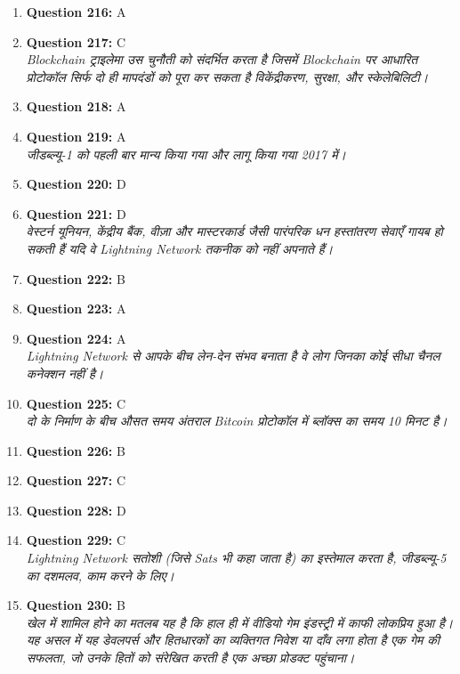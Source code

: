 \documentclass[12pt,a4paper]{article}
\begin{document}
\begin{enumerate}
\item \textbf{Question 216:} A

\item \textbf{Question 217:} C
\\ \textit{Blockchain ट्राइलेमा उस चुनौती को संदर्भित करता है जिसमें Blockchain पर आधारित प्रोटोकॉल सिर्फ दो ही मापदंडों को पूरा कर सकता है विकेंद्रीकरण, सुरक्षा, और स्केलेबिलिटी।}

\item \textbf{Question 218:} A

\item \textbf{Question 219:} A
\\ \textit{जीडब्ल्यू-1 को पहली बार मान्य किया गया और लागू किया गया 2017 में।}

\item \textbf{Question 220:} D

\item \textbf{Question 221:} D
\\ \textit{वेस्टर्न यूनियन, केंद्रीय बैंक, वीज़ा और मास्टरकार्ड जैसी पारंपरिक धन हस्तांतरण सेवाएँ गायब हो सकती हैं यदि वे Lightning Network तकनीक को नहीं अपनाते हैं।}

\item \textbf{Question 222:} B

\item \textbf{Question 223:} A

\item \textbf{Question 224:} A
\\ \textit{Lightning Network से आपके बीच लेन-देन संभव बनाता है वे लोग जिनका कोई सीधा चैनल कनेक्शन नहीं है।}

\item \textbf{Question 225:} C
\\ \textit{दो के निर्माण के बीच औसत समय अंतराल Bitcoin प्रोटोकॉल में ब्लॉक्स का समय 10 मिनट है।}

\item \textbf{Question 226:} B

\item \textbf{Question 227:} C

\item \textbf{Question 228:} D

\item \textbf{Question 229:} C
\\ \textit{Lightning Network सतोशी (जिसे Sats भी कहा जाता है) का इस्तेमाल करता है, जीडब्ल्यू-5 का दशमलव, काम करने के लिए।}

\item \textbf{Question 230:} B
\\ \textit{खेल में शामिल होने का मतलब यह है कि हाल ही में वीडियो गेम इंडस्ट्री में काफी लोकप्रिय हुआ है। यह असल में यह डेवलपर्स और हितधारकों का व्यक्तिगत निवेश या दाँव लगा होता है एक गेम की सफलता, जो उनके हितों को संरेखित करती है एक अच्छा प्रोडक्ट पहुंचाना।}


\end{enumerate}
\end{document}
